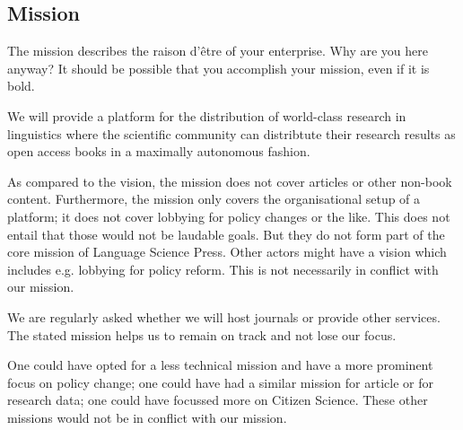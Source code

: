 \documentclass[output=guidelines,nonflat,smallfont,
draftmode
]{langsci/langscibook}
\newcommand{\background}[1]{ 
  \vspace{5mm}
  \renewcommand{\tblslinecolour}{lsDarkBlue}
  \tblssy[red]{explore2}{Background}{\vspace*{-5mm}#1}
}
\newcommand{\langscisolution}[1]{
  \renewcommand{\tblslinecolour}{lsLightBlue}
  \tblssy{langsci}{LangSci solution}{\vspace*{-5mm}#1}
}
\newcommand{\evaluation}[1]{
  \renewcommand{\tblslinecolour}{lsLightOrange}
  \tblssy{receipt}{Evaluation}{\vspace*{-5mm}#1}
}
\newcommand{\othersolutions}[1]{
  \renewcommand{\tblslinecolour}{lsDarkGreenOne}
  \tblssy{more}{Other solutions}{\vspace*{-5mm}#1}
}
\renewcommand{\tblssy}[4][black!12]{%
  \renewcommand{\langscisymbol}{#2}\renewcommand{\tblsboxcolor}{#1}
  \begin{mdframed}[style=yellowexercise,frametitle={#3}]
    #4
  \end{mdframed}
}
\begin{document}
\subsection{Mission}
\background{The mission describes the raison d'être of your enterprise. Why are you here anyway? It should be possible that you accomplish your mission, even if it is bold.}
\langscisolution{ 
We will provide a platform for the distribution of world-class research in linguistics where the scientific community can distribtute their research results as open access books in a maximally autonomous fashion.
}
\evaluation{
As compared to the vision, the mission does not cover articles or other non-book content. Furthermore, the mission only covers the organisational setup of a platform; it does not cover lobbying for policy changes or the like. This does not entail that those would not be laudable goals. But they do not form part of the core mission of Language Science Press. Other actors might have a vision which includes e.g. lobbying for policy reform. This is not necessarily in conflict with our mission.

We are regularly asked whether we will host journals or provide other services. The stated mission helps us to remain on track and not lose our focus.}
\othersolutions{One could have opted for a less technical mission and have a more prominent focus on policy change; one could have had a similar mission for article or for research data; one could have focussed more on Citizen Science. These other missions would not be in conflict with our mission. } 
\end{document}
